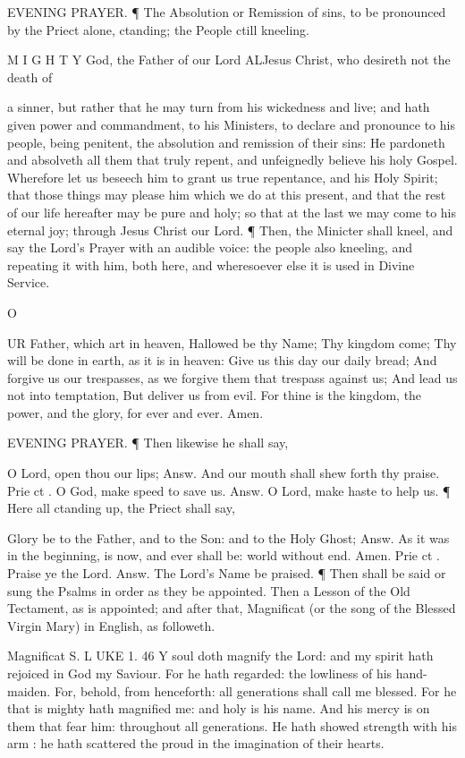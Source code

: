 EVENING PRAYER. ¶ The Absolution or Remission of sins, to be pronounced by the Priect alone, ctanding; the People ctill kneeling.

M I G H T Y God, the Father of our Lord ALJesus Christ, who desireth not the death of

a sinner, but rather that he may turn from his wickedness and live; and hath given power and commandment, to his Ministers, to declare and pronounce to his people, being penitent, the absolution and remission of their sins: He pardoneth and absolveth all them that truly repent, and unfeignedly believe his holy Gospel. Wherefore let us beseech him to grant us true repentance, and his Holy Spirit; that those things may please him which we do at this present, and that the rest of our life hereafter may be pure and holy; so that at the last we may come to his eternal joy; through Jesus Christ our Lord. ¶ Then, the Minicter shall kneel, and say the Lord’s Prayer with an audible voice: the people also kneeling, and repeating it with him, both here, and wheresoever else it is used in Divine Service.

O

UR Father, which art in heaven, Hallowed be thy Name; Thy kingdom come; Thy will be done in earth, as it is in heaven: Give us this day our daily bread; And forgive us our trespasses, as we forgive them that trespass against us; And lead us not into temptation, But deliver us from evil. For thine is the kingdom, the power, and the glory, for ever and ever. Amen.

EVENING PRAYER. ¶ Then likewise he shall say,

O Lord, open thou our lips; Answ. And our mouth shall shew forth thy praise. Prie ct . O God, make speed to save us. Answ. O Lord, make haste to help us. ¶ Here all ctanding up, the Priect shall say,

Glory be to the Father, and to the Son: and to the Holy Ghost; Answ. As it was in the beginning, is now, and ever shall be: world without end. Amen. Prie ct . Praise ye the Lord. Answ. The Lord’s Name be praised. ¶ Then shall be said or sung the Psalms in order as they be appointed. Then a Lesson of the Old Tectament, as is appointed; and after that, Magnificat (or the song of the Blessed Virgin Mary) in English, as followeth.

Magnificat S. L UKE 1. 46 Y soul doth magnify the Lord: and my spirit hath rejoiced in God my Saviour. For he hath regarded: the lowliness of his hand-maiden. For, behold, from henceforth: all generations shall call me blessed. For he that is mighty hath magnified me: and holy is his name. And his mercy is on them that fear him: throughout all generations. He hath showed strength with his arm : he hath scattered the proud in the imagination of their hearts.

